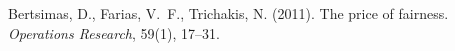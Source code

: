 \documentclass[preprint,12pt]{elsarticle}
\begin{document}

\begin{thebibliography}{99}

Bertsimas, D., Farias, V.~F., Trichakis, N. (2011).
The price of fairness.
\emph{Operations Research}, 59(1), 17--31.


\end{thebibliography}
\end{document}
